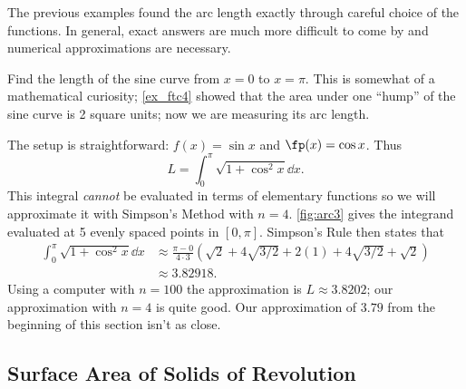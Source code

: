 The previous examples found the arc length exactly through careful choice of the functions. In general, exact answers are much more difficult to come by and numerical approximations are necessary.

\begin{example}\label{ex_arc3}
Find the length of the sine curve from $x=0$ to $x=\pi$.
\solution
This is somewhat of a mathematical curiosity; \autoref{ex_ftc4} showed that the area under one ``hump'' of the sine curve is 2 square units; now we are measuring its arc length.


The setup is straightforward: $f(x) = \sin x$ and $\fp(x) = \cos x$. Thus 
\[L = \int_0^\pi \sqrt{1+\cos^2x}\dd x.\]
This integral \emph{cannot} be evaluated in terms of elementary functions so we will approximate it with Simpson's Method with $n=4$. \autoref{fig:arc3} gives the integrand evaluated at 5 evenly spaced points in $[0,\pi]$. Simpson's Rule then states that 
\begin{align*}
	\int_0^\pi \sqrt{1+\cos^2x}\dd x
	&\approx	\frac{\pi-0}{4\cdot 3}
	\left(\sqrt{2}+4\sqrt{3/2}+2(1)+4\sqrt{3/2}+\sqrt{2}\right) \\
	&\approx3.82918.
\end{align*}
Using a computer with $n=100$ the approximation is $L\approx 3.8202$; our approximation with $n=4$ is quite good.  Our approximation of $3.79$ from the beginning of this section isn't as close.
\end{example}

\subsection{Surface Area of Solids of Revolution}



